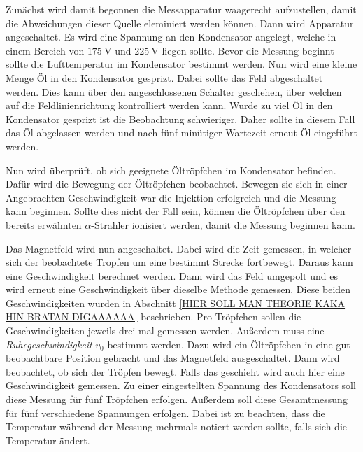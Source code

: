 Zunächst wird damit begonnen die Messapparatur waagerecht aufzustellen, damit die Abweichungen dieser Quelle eleminiert werden können. Dann wird Apparatur angeschaltet. Es 
wird eine Spannung an den Kondensator angelegt, welche in einem Bereich von $\qty{175}{\volt}$ und $\qty{225}{\volt}$ liegen sollte. Bevor die Messung beginnt sollte die 
Lufttemperatur im Kondensator bestimmt werden. Nun wird eine kleine Menge Öl in den Kondensator gesprizt. Dabei sollte das Feld abgeschaltet werden. Dies kann über den 
angeschlossenen Schalter geschehen, über welchen auf die Feldlinienrichtung kontrolliert werden kann. Wurde zu viel Öl in den Kondensator gesprizt ist die Beobachtung 
schwieriger. Daher sollte in diesem Fall das Öl abgelassen werden und nach fünf-minütiger Wartezeit erneut Öl eingeführt werden. 

Nun wird überprüft, ob sich geeignete Öltröpfchen im Kondensator befinden. Dafür wird die Bewegung der Öltröpfchen beobachtet. Bewegen sie sich in einer Angebrachten 
Geschwindigkeit war die Injektion erfolgreich und die Messung kann beginnen. Sollte dies nicht der Fall sein, können die Öltröpfchen über den bereits erwähnten 
$\alpha$-Strahler ionisiert werden, damit die Messung beginnen kann. 

Das Magnetfeld wird nun angeschaltet. Dabei wird die Zeit gemessen, in welcher sich der beobachtete Tropfen um eine bestimmt Strecke fortbewegt. Daraus kann eine Geschwindigkeit
berechnet werden. Dann wird das Feld umgepolt und es wird erneut eine Geschwindigkeit über dieselbe Methode gemessen. Diese beiden Geschwindigkeiten wurden in Abschnitt \ref{HIER SOLL MAN THEORIE KAKA HIN BRATAN DIGAAAAAA}
beschrieben. Pro Tröpfchen sollen die Geschwindigkeiten jeweils drei mal gemessen werden. Außerdem muss eine \textit{Ruhegeschwindigkeit} $v_0$ bestimmt werden. Dazu wird ein 
Öltröpfchen in eine gut beobachtbare Position gebracht und das Magnetfeld ausgeschaltet. Dann wird beobachtet, ob sich der Tröpfen bewegt. Falls das geschieht wird auch hier 
eine Geschwindigkeit gemessen. Zu einer eingestellten Spannung des Kondensators soll diese Messung für fünf Tröpfchen erfolgen. Außerdem soll diese Gesamtmessung für fünf 
verschiedene Spannungen erfolgen. Dabei ist zu beachten, dass die Temperatur während der Messung mehrmals notiert werden sollte, falls sich die Temperatur ändert. 